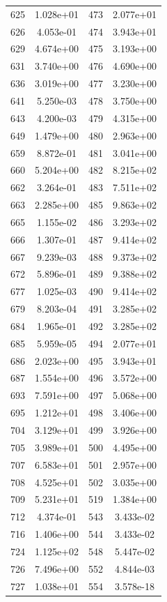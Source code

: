 \documentclass[12pt]{article}
\begin{document}
\begin{longtable}{@{}cccc@{}}
625 & 1.028e+01 & 473 & 2.077e+01 \\
626 & 4.053e-01 & 474 & 3.943e+01 \\
629 & 4.674e+00 & 475 & 3.193e+00 \\
631 & 3.740e+00 & 476 & 4.690e+00 \\
636 & 3.019e+00 & 477 & 3.230e+00 \\
641 & 5.250e-03 & 478 & 3.750e+00 \\
643 & 4.200e-03 & 479 & 4.315e+00 \\
649 & 1.479e+00 & 480 & 2.963e+00 \\
659 & 8.872e-01 & 481 & 3.041e+00 \\
660 & 5.204e+00 & 482 & 8.215e+02 \\
662 & 3.264e-01 & 483 & 7.511e+02 \\
663 & 2.285e+00 & 485 & 9.863e+02 \\
665 & 1.155e-02 & 486 & 3.293e+02 \\
666 & 1.307e-01 & 487 & 9.414e+02 \\
667 & 9.239e-03 & 488 & 9.373e+02 \\
672 & 5.896e-01 & 489 & 9.388e+02 \\
677 & 1.025e-03 & 490 & 9.414e+02 \\
679 & 8.203e-04 & 491 & 3.285e+02 \\
684 & 1.965e-01 & 492 & 3.285e+02 \\
685 & 5.959e-05 & 494 & 2.077e+01 \\
686 & 2.023e+00 & 495 & 3.943e+01 \\
687 & 1.554e+00 & 496 & 3.572e+00 \\
693 & 7.591e+00 & 497 & 5.068e+00 \\
695 & 1.212e+01 & 498 & 3.406e+00 \\
704 & 3.129e+01 & 499 & 3.926e+00 \\
705 & 3.989e+01 & 500 & 4.495e+00 \\
707 & 6.583e+01 & 501 & 2.957e+00 \\
708 & 4.525e+01 & 502 & 3.035e+00 \\
709 & 5.231e+01 & 519 & 1.384e+00 \\
712 & 4.374e-01 & 543 & 3.433e-02 \\
716 & 1.406e+00 & 544 & 3.433e-02 \\
724 & 1.125e+02 & 548 & 5.447e-02 \\
726 & 7.496e+00 & 552 & 4.844e-03 \\
727 & 1.038e+01 & 554 & 3.578e-18 \\

\end{longtable}
\end{document}
